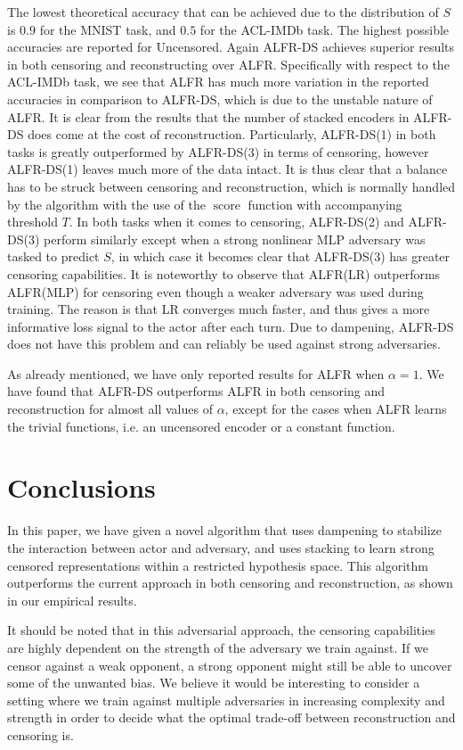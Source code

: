 \documentclass[nohyperref]{article}
\theoremstyle{plain}
\theoremstyle{definition}
\theoremstyle{remark}
\begin{document}
The lowest theoretical accuracy that can be achieved due to the distribution of $S$ is $0.9$ for the MNIST task, and $0.5$ for the ACL-IMDb task. The highest possible accuracies are reported for Uncensored. Again ALFR-DS achieves superior results in both censoring and reconstructing over ALFR. Specifically with respect to the ACL-IMDb task, we see that ALFR has much more variation in the reported accuracies in comparison to ALFR-DS, which is due to the unstable nature of ALFR. It is clear from the results that the number of stacked encoders in ALFR-DS does come at the cost of reconstruction. Particularly, ALFR-DS(1) in both tasks is greatly outperformed by ALFR-DS(3) in terms of censoring, however ALFR-DS(1) leaves much more of the data intact. It is thus clear that a balance has to be struck between censoring and reconstruction, which is normally handled by the algorithm with the use of the $\mathop{score}$ function with accompanying threshold $T$.
In both tasks when it comes to censoring, ALFR-DS(2) and ALFR-DS(3) perform similarly except when a strong nonlinear MLP adversary was tasked to predict $S$, in which case it becomes clear that ALFR-DS(3) has greater censoring capabilities. It is noteworthy to observe that ALFR(LR) outperforms ALFR(MLP) for censoring even though a weaker adversary was used during training. The reason is that LR converges much faster, and thus gives a more informative loss signal to the actor after each turn. Due to dampening, ALFR-DS does not have this problem and can reliably be used against strong adversaries.

As already mentioned, we have only reported results for ALFR when $\alpha=1$. We have found that ALFR-DS outperforms ALFR in both censoring and reconstruction for almost all values of $\alpha$, except for the cases when ALFR learns the trivial functions, i.e. an uncensored encoder or a constant function.
\section{Conclusions}
\label{conclusions}
In this paper, we have given a novel algorithm that uses dampening to stabilize the interaction between actor and adversary, and uses stacking to learn strong censored representations within a restricted hypothesis space. This algorithm outperforms the current approach in both censoring and reconstruction, as shown in our empirical results.

It should be noted that in this adversarial approach, the censoring capabilities are highly dependent on the strength of the adversary we train against. If we censor against a weak opponent, a strong opponent might still be able to uncover some of the unwanted bias. We believe it would be interesting to consider a setting where we train against multiple adversaries in increasing complexity and strength in order to decide what the optimal trade-off between reconstruction and censoring is.
\end{document}
